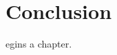 %
%
\let\textcircled=\pgftextcircled
\chapter{Conclusion}
\label{chap:cl}

egins a chapter. 

\
\
\
\
\
\

